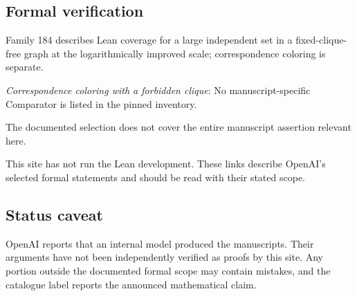 \documentclass[11pt]{article}
\begin{document}
\subsection{Formal verification}
Family 184 describes Lean coverage for a large independent set in a fixed-clique-free graph at the logarithmically improved scale; correspondence coloring is separate.

\textit{Correspondence coloring with a forbidden clique}: No manuscript-specific Comparator is listed in the pinned inventory.

The documented selection does not cover the entire manuscript assertion relevant here.

This site has not run the Lean development. These links describe OpenAI’s selected formal statements and should be read with their stated scope.

\subsection{Status caveat}
OpenAI reports that an internal model produced the manuscripts. Their arguments have not been independently verified as proofs by this site. Any portion outside the documented formal scope may contain mistakes, and the catalogue label reports the announced mathematical claim.
\end{document}
